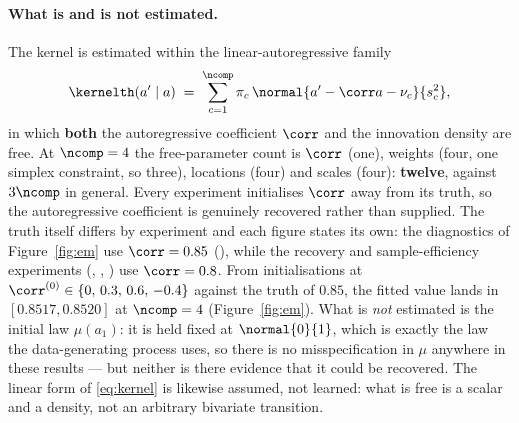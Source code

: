 \documentclass{article}
\begin{document}
\paragraph{What is and is not estimated.} The kernel is estimated within the
linear-autoregressive family
\begin{equation}
\label{eq:kernel}
\kernelth(a'\mid a) \;=\; \sum_{c=1}^{\ncomp} \pi_c \,
\normal{a' - \corr a - \nu_c}{s_c^2},
\end{equation}
in which \textbf{both} the autoregressive coefficient $\corr$ and the innovation density are
free. At $\ncomp=4$ the free-parameter count is $\corr$ (one), weights (four, one simplex
constraint, so three), locations (four) and scales (four): \textbf{twelve}, against $3\ncomp$ in
general. Every experiment initialises $\corr$ away from its truth, so the autoregressive
coefficient is genuinely recovered rather than supplied. The truth itself differs by experiment
and each figure states its own: the diagnostics of Figure~\ref{fig:em} use $\corr=0.85$
(), while the recovery and sample-efficiency experiments
(, , ) use $\corr=0.8$. From
initialisations at $\corr^{(0)}\in\{0,\,0.3,\,0.6,\,-0.4\}$ against the truth of $0.85$, the
fitted value lands in $[0.8517, 0.8520]$ at $\ncomp=4$ (Figure~\ref{fig:em}). What is \emph{not} estimated is the initial law $\mu(a_1)$: it is held
fixed at $\normal{0}{1}$, which is exactly the law the data-generating process uses, so there is
no misspecification in $\mu$ anywhere in these results --- but neither is there evidence that it
could be recovered. The linear form of \eqref{eq:kernel} is likewise assumed, not learned: what
is free is a scalar and a density, not an arbitrary bivariate transition.
\end{document}
